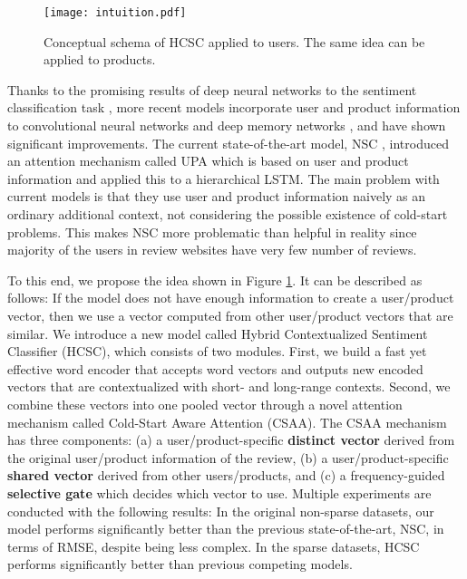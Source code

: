 \documentclass[11pt,a4paper]{article}
\begin{document}
\begin{figure}
    \centering
    \texttt{[image: intuition.pdf]}
    \caption{Conceptual schema of HCSC applied to users. The same idea can be applied to products.}
    \label{fig:intro}
\end{figure}

Thanks to the promising results of deep neural networks to the sentiment classification task \cite{glorot2011domain,tang2014coooolll}, more recent models incorporate user and product information to convolutional neural networks \cite{tang2015learning} and deep memory networks \cite{dou2017capturing}, and have shown significant improvements. The current state-of-the-art model, NSC \cite{chen2016neural}, introduced an attention mechanism called UPA which is based on user and product information
and applied this to a hierarchical LSTM.
The main problem with current models is that they use user and product information naively as an ordinary additional context, not considering the possible existence of cold-start problems.
This makes NSC more problematic than helpful in reality since majority of the users in review websites have very few number of reviews.

To this end, we propose the idea shown in Figure \ref{fig:intro}. It can be described as follows: If the model does not have enough information to create a user/product vector, then we use a vector computed from other user/product vectors that are similar.
We introduce a new model called Hybrid Contextualized Sentiment Classifier (HCSC), which consists of two modules.
First, we build a fast yet effective word encoder that accepts word vectors and outputs new encoded vectors that are contextualized with short- and long-range contexts.
Second, we combine these vectors into one pooled vector through a novel attention mechanism called Cold-Start Aware Attention (CSAA). The CSAA mechanism has three components: (a) a user/product-specific \textbf{distinct vector} derived from the original user/product information of the review, (b) a user/product-specific \textbf{shared vector} derived from other users/products, and (c) a frequency-guided \textbf{selective gate} which decides which vector to use.
Multiple experiments are conducted with the following results:
In the original non-sparse datasets, our model performs significantly better than the previous state-of-the-art, NSC, in terms of RMSE, despite being less complex.
In the sparse datasets, HCSC performs significantly better than previous competing models.
\end{document}
